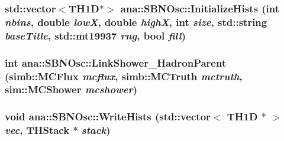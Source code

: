 \label{namespaceana_1_1SBNOsc_a06684ac90b7f2450f87b5cebe46e63d3}
\hypertarget{namespaceana_1_1SBNOsc_a9562f13f1927dd6d87f47a116ea88773}{
\subsubsection[{InitializeHists}]{\setlength{\rightskip}{0pt plus 5cm}std::vector$<$TH1D$\ast$$>$ ana::SBNOsc::InitializeHists (int {\em nbins}, \/  double {\em lowX}, \/  double {\em highX}, \/  int {\em size}, \/  std::string {\em baseTitle}, \/  std::mt19937 {\em rng}, \/  bool {\em fill})}}
\label{namespaceana_1_1SBNOsc_a9562f13f1927dd6d87f47a116ea88773}
\hypertarget{namespaceana_1_1SBNOsc_a3b92678464aac3671246acd19a96e49a}{
\subsubsection[{LinkShower\_\-HadronParent}]{\setlength{\rightskip}{0pt plus 5cm}int ana::SBNOsc::LinkShower\_\-HadronParent (simb::MCFlux {\em mcflux}, \/  simb::MCTruth {\em mctruth}, \/  sim::MCShower {\em mcshower})}}
\label{namespaceana_1_1SBNOsc_a3b92678464aac3671246acd19a96e49a}
\hypertarget{namespaceana_1_1SBNOsc_a95cf1192e7bd36e933fbb8333e88391a}{
\subsubsection[{WriteHists}]{\setlength{\rightskip}{0pt plus 5cm}void ana::SBNOsc::WriteHists (std::vector$<$ TH1D $\ast$ $>$ {\em vec}, \/  THStack $\ast$ {\em stack})}}
\label{namespaceana_1_1SBNOsc_a95cf1192e7bd36e933fbb8333e88391a}


